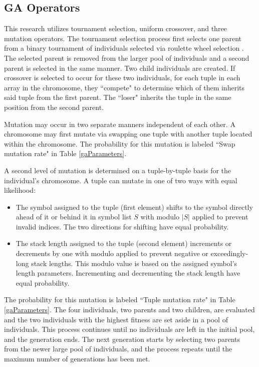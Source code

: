 \documentclass[conference]{IEEEtran}
\begin{document}
\subsection{GA Operators}
This research utilizes tournament selection, uniform crossover, and three mutation operators.
The tournament selection process first selects one parent from a binary tournament of individuals selected via roulette wheel selection \cite{Miller1995GeneticAT}.
The selected parent is removed from the larger pool of individuals and a second parent is selected in the same manner.
Two child individuals are created.
If crossover is selected to occur for these two individuals, for each tuple in each array in the chromosome, they ``compete" to determine which of them inherits said tuple from the first parent.
The ``loser" inherits the tuple in the same position from the second parent.
\par
Mutation may occur in two separate manners independent of each other.
A chromosome may first mutate via swapping one tuple with another tuple located within the chromosome.
The probability for this mutation is labeled ``Swap mutation rate" in Table \ref{gaParameters}.
\par
A second level of mutation is determined on a tuple-by-tuple basis for the individual's chromosome.
A tuple can mutate in one of two ways with equal likelihood:
\begin{itemize}
\item The symbol assigned to the tuple (first element) shifts to the symbol directly ahead of it or behind it in symbol list $S$ with modulo $|S|$ applied to prevent invalid indices. The two directions for shifting have equal probability.
\item The stack length assigned to the tuple (second element) increments or decrements by one with modulo applied to prevent negative or exceedingly-long stack lengths.
This modulo value is based on the assigned symbol's length parameters.
Incrementing and decrementing the stack length have equal probability.
\end{itemize}
The probability for this mutation is labeled ``Tuple mutation rate" in Table \ref{gaParameters}.
The four individuals, two parents and two children, are evaluated and the two individuals with the highest fitness are set aside in a pool of individuals.
This process continues until no individuals are left in the initial pool, and the generation ends.
The next generation starts by selecting two parents from the newer large pool of individuals, and the process repeats until the maximum number of generations has been met.
\end{document}
